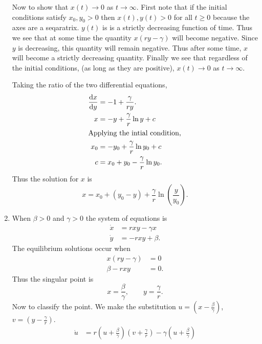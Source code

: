 \begin{Solution}
\begin{enumerate}
    Now to show that $x(t) \to 0$ as $t \to \infty$.  First note that if the 
    initial conditions satisfy $x_0, y_0 > 0$ then $x(t), y(t) > 0$ for all
    $t \geq 0$ because the axes are a seqaratrix.  
    $y(t)$ is is a strictly decreasing function of time.  Thus we
    see that at some time the quantity $x(r y - \gamma)$ will become negative.
    Since $y$ is decreasing, this quantity will remain negative.  Thus after
    some time, $x$ will become a strictly decreasing quantity.  Finally
    we see that regardless of the initial conditions,
    (as long as they are positive), $x(t) \to 0$ as $t \to \infty$.









    Taking the ratio of the two differential equations,
    \begin{align*}
      \frac{\mathrm{d} x}{\mathrm{d} y} &= -1 + \frac{\gamma}{r y}. \\
      x &= -y + \frac{\gamma}{r} \ln y + c \\
      \intertext{Applying the intial condition,}
      x_0 &= -y_0 + \frac{\gamma}{r} \ln y_0 + c \\
      c &= x_0 + y_0 - \frac{\gamma}{r} \ln y_0.
    \end{align*}
    Thus the solution for $x$ is
    \[ \boxed{ x = x_0 + (y_0 - y) + \frac{\gamma}{r} \ln \left( \frac{y}{y_0}
      \right) . } \]
  \item
    When $\beta > 0$ and $\gamma > 0$ the system of equations is
    \begin{align*}
      \dot{x} &= r x y - \gamma x \\
      \dot{y} &= -r x y + \beta.
    \end{align*}
    The equilibrium solutions occur when
    \begin{align*}
      x (r y - \gamma) &= 0 \\
      \beta - r x y &= 0.
    \end{align*}
    Thus the singular point is
    \[ \boxed{ x = \frac{\beta}{\gamma}, \qquad y = \frac{\gamma}{r}. } \]
    Now to classify the point.  We make the substitution 
    $u = (x-\frac{\beta}{\gamma})$, $v = (y - \frac{\gamma}{r})$.
    \begin{align*}
      \dot{u} &= r \left( u + \frac{\beta}{\gamma} \right) \left( v + 
        \frac{\gamma}{r} \right) - \gamma \left( u + \frac{\beta}{\gamma}
      \right) \\

\end{align*}
\end{enumerate}
\end{Solution}
